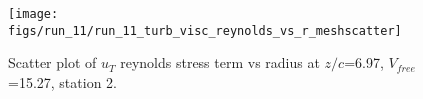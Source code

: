 \begin{figure}[H]
\centering
\texttt{[image: figs/run\_11/run\_11\_turb\_visc\_reynolds\_vs\_r\_meshscatter]}
\caption{Scatter plot of $
u_T$ reynolds stress term vs radius at $z/c$=6.97, $V_{free}$=15.27, station 2.}
\label{fig:run_11_turb_visc_reynolds_vs_r_meshscatter}
\end{figure}


